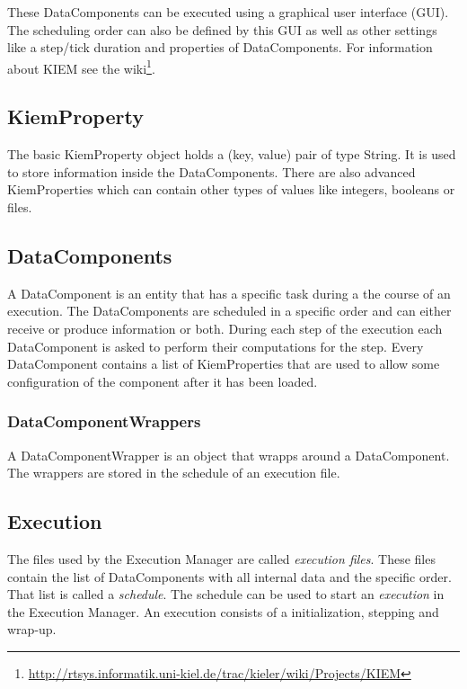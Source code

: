 These DataComponents can be executed using a graphical user interface (GUI). 
The scheduling order can also be defined by this GUI as well as other settings like a step/tick duration and properties of DataComponents.
For information about \ac{KIEM} see the wiki\footnote{\url{http://rtsys.informatik.uni-kiel.de/trac/kieler/wiki/Projects/KIEM}}.

\subsection{KiemProperty}
\label{section:IntroKiemProperty}
The basic KiemProperty object holds a (key, value) pair of type String. It is used to store information
inside the DataComponents. There are also advanced KiemProperties which can contain other types of values
like integers, booleans or files.

\subsection{DataComponents}
\label{section:IntroDataComponent}
A DataComponent is an entity that has a specific task during a the course of an execution. The
DataComponents are scheduled in a specific order and can either receive or produce information or both. 
During each step of the execution each DataComponent is asked to perform their computations for the step. Every
DataComponent contains a list of KiemProperties that are used to allow some configuration of the component
after it has been loaded.

\subsubsection{DataComponentWrappers}
\label{section:IntroDataComponentWrapper}
A DataComponentWrapper is an object that wrapps around a DataComponent. The wrappers are stored in the schedule
of an execution file.

\subsection{Execution}
\label{section:IntroExecution}
The files used by the Execution Manager are called \textit{execution files}. These files contain 
the list of DataComponents with all internal data and the specific order. That list is called a
\textit{schedule}. The schedule can be used to start an \textit{execution} in the Execution Manager.
An execution consists of a initialization, stepping and wrap-up.

